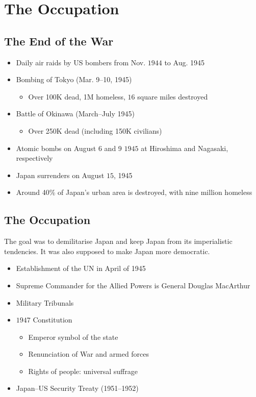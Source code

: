 \documentclass[class=article, crop=false]{standalone}
\begin{document}
  \section{The Occupation}
  \subsection{The End of the War}
  \begin{itemize}
    \item Daily air raids by US bombers from Nov. $1944$ to Aug. 1945
    \item Bombing of Tokyo (Mar. 9--10, 1945)
    \begin{itemize}
      \item Over 100K dead, 1M homeless, $16$ square miles destroyed
    \end{itemize}
    \item Battle of Okinawa (March--July 1945)
    \begin{itemize}
      \item Over 250K dead (including 150K civilians)
    \end{itemize}
    \item Atomic bombs on August 6 and 9 $1945$ at Hiroshima and Nagasaki, respectively
    \item Japan surrenders on August $15$, 1945
    \item Around 40\% of Japan's urban area is destroyed, with nine million homeless
  \end{itemize}
  \subsection{The Occupation}
  \begin{note}{}
    The goal was to demilitarise Japan and keep Japan from its imperialistic tendencies. It was also supposed to make Japan more democratic.
  \end{note}
  \begin{itemize}
    \item Establishment of the UN in April of 1945
    \item Supreme Commander for the Allied Powers is General Douglas MacArthur
    \item Military Tribunals
    \item $1947$ Constitution
    \begin{itemize}
      \item Emperor symbol of the state
      \item Renunciation of War and armed forces
      \item Rights of people: universal suffrage
    \end{itemize}
    \item Japan--US Security Treaty (1951--1952)
  \end{itemize}
\end{document}
